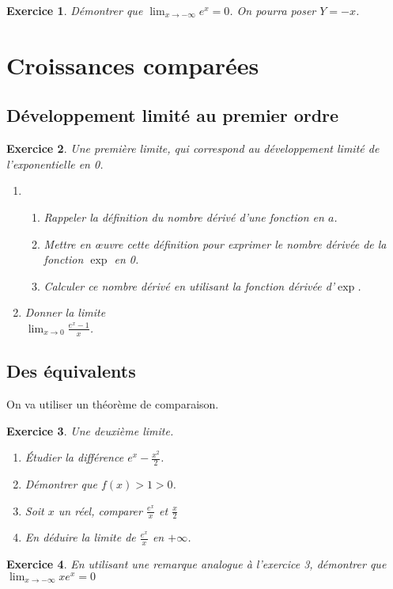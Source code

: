 \documentclass[12pt,a4paper,french]{article}
\theoremstyle{break}
\theoremstyle{plain}
\newtheorem{exerciceT}{Exercice}
\theoremstyle{nonumberplain}
\theoremstyle{nonumberbreak}
\newenvironment{exercice}{\begin{framed}\begin{exerciceT}}{\end{exerciceT}\end{framed}}
\begin{document}
\begin{exercice}
  Démontrer que $\lim_{x\to-\infty}e^x = 0$. On pourra poser $Y = -x$.
\end{exercice}

\section{Croissances comparées}

\subsection{Développement limité au premier ordre}

\begin{exercice}
  Une première limite, qui correspond au développement limité de
  l'exponentielle en 0.
  \begin{enumerate}
    \item
      \begin{enumerate}
        \item Rappeler la définition du nombre dérivé d'une fonction en
          $a$.
        \item Mettre en œuvre cette définition pour exprimer le nombre
          dérivée de la fonction $\exp$ en 0.
        \item Calculer ce nombre dérivé en utilisant la fonction
          dérivée d'$\exp$.
      \end{enumerate}
    \item Donner la limite \\$\lim_{x\to0}\frac{e^x - 1}{x}$.
  \end{enumerate}
\end{exercice}

\subsection{Des équivalents}

On va utiliser un théorème de comparaison.
\begin{exercice}
  Une deuxième limite.
  \begin{enumerate}
    \item Étudier la différence $e^x - \frac{x^2}2$.
    \item Démontrer que $f(x) > 1 > 0$.
    \item Soit $x$ un réel, comparer $\frac{e^x}x$ et $\frac{x}2$
    \item En déduire la limite de $\frac{e^x}x$ en $+\infty$.
  \end{enumerate}
\end{exercice}

\begin{exercice}
  En utilisant une remarque analogue à l'exercice 3, démontrer que
  $\lim_{x\to-\infty}xe^x = 0$
\end{exercice}
\end{document}
